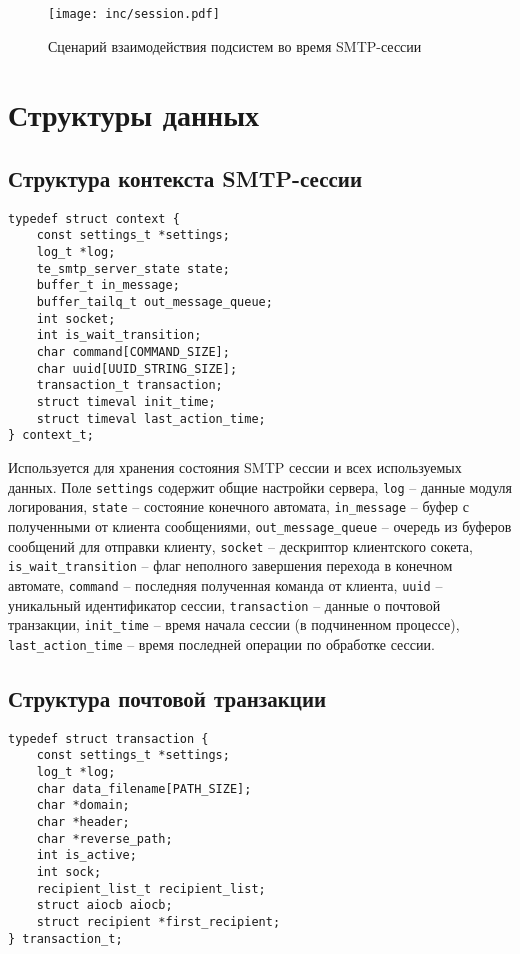 \begin{figure}[ht!]
    \centering
    \texttt{[image: inc/session.pdf]}
    \caption{Сценарий взаимодействия подсистем во время SMTP-сессии}
    \label{fig:session}
\end{figure}

\section{Структуры данных}

\subsection{Структура контекста SMTP-сессии}

\begin{verbatim}
typedef struct context {
    const settings_t *settings;
    log_t *log;
    te_smtp_server_state state;
    buffer_t in_message;
    buffer_tailq_t out_message_queue;
    int socket;
    int is_wait_transition;
    char command[COMMAND_SIZE];
    char uuid[UUID_STRING_SIZE];
    transaction_t transaction;
    struct timeval init_time;
    struct timeval last_action_time;
} context_t;
\end{verbatim}

Используется для хранения состояния SMTP сессии и всех используемых данных.
Поле \verb;settings; содержит общие настройки сервера,
\verb;log; -- данные модуля логирования,
\verb;state; -- состояние конечного автомата,
\verb;in_message; -- буфер с полученными от клиента сообщениями,
\verb;out_message_queue; -- очередь из буферов сообщений для отправки клиенту,
\verb;socket; -- дескриптор клиентского сокета,
\verb;is_wait_transition; -- флаг неполного завершения перехода в конечном автомате,
\verb;command; -- последняя полученная команда от клиента,
\verb;uuid; -- уникальный идентификатор сессии,
\verb;transaction; -- данные о почтовой транзакции,
\verb;init_time; -- время начала сессии (в подчиненном процессе),
\verb;last_action_time; -- время последней операции по обработке сессии.

\subsection{Структура почтовой транзакции}

\begin{verbatim}
typedef struct transaction {
    const settings_t *settings;
    log_t *log;
    char data_filename[PATH_SIZE];
    char *domain;
    char *header;
    char *reverse_path;
    int is_active;
    int sock;
    recipient_list_t recipient_list;
    struct aiocb aiocb;
    struct recipient *first_recipient;
} transaction_t;
\end{verbatim}

